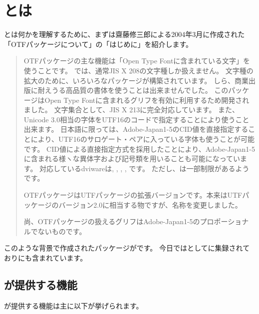 \documentclass[../otf-unofficial-guide]{subfiles}
\begin{document}
\section{\texorpdfstring{}{otfパッケージ}とは}

とは何かを理解するために、まずは齋藤修三郎{\氏}による2004年3月に作成された「OTFパッケージについて」の「はじめに」を紹介します。

\begin{quotation}
  OTFパッケージの主な機能は「Open Type Fontに含まれている文字」を使うことです。
  {\pLaTeX}では、通常JIS X 208の文字種しか扱えません。
  文字種の拡大のために、いろいろなパッケージが構築されています。
  しら、商業出版に耐えうる高品質の書体を使うことは出来ませんでした。
  このパッケージはOpen Type Fontに含まれるグリフを有効に利用するため開発されました。
  文字集合として、JIS X 213に完全対応しています。
  また、Unicode 3.0相当の字体をUTF16のコードで指定することにより使うこと出来ます。
  日本語に限っては、Adobe-Japan1-5のCID値を直接指定することにより、UTF16のサロゲート・ペアに入っている字体も使うことが可能です。
  CID値による直接指定方式を採用したことにより、Adobe-Japan1-5に含まれる様ヽな異体字および記号類を用いることも可能になっています。
  対応しているdviwareは, , , , です。
  ただし、は一部制限があるようです。

  OTFパッケージはUTFパッケージの拡張バージョンです。本来はUTFパッケージのバージョン2.0に相当する物ですが、名称を変更しました。

  尚、OTFパッケージの扱えるグリフはAdobe-Japan1-5のプロポーショナルでないものです。
\end{quotation}

このような背景で作成されたパッケージがです。
今日ではとして{\CTAN}に集録されており{\TeXLive}にも含まれています。

\subsection{\texorpdfstring{}{otfパッケージ}が提供する機能}

が提供する機能は主に以下が挙げられます。
\end{document}
